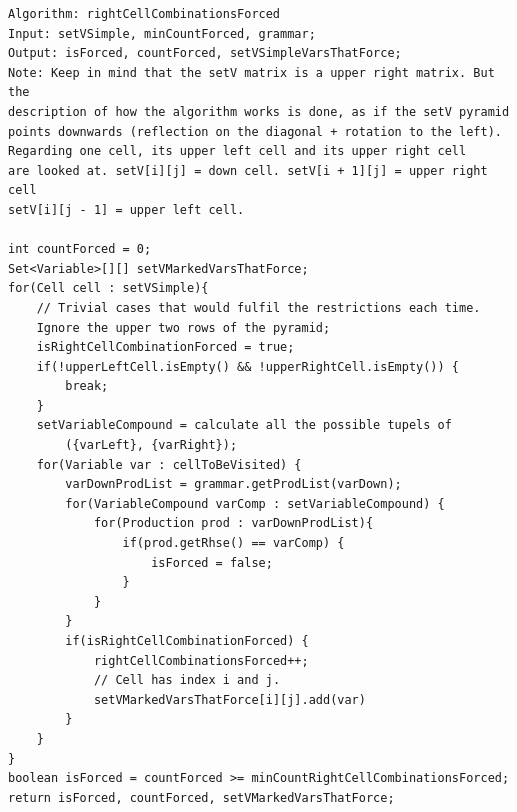 \pagebreak

\lstset{language=java}
\begin{lstlisting}[frame=htrbl, caption={rightCellCombinationsForced}, 
label={lst:rightCellCombinationsForced}]
Algorithm: rightCellCombinationsForced
Input: setVSimple, minCountForced, grammar;
Output: isForced, countForced, setVSimpleVarsThatForce;
Note: Keep in mind that the setV matrix is a upper right matrix. But the
description of how the algorithm works is done, as if the setV pyramid 
points downwards (reflection on the diagonal + rotation to the left).
Regarding one cell, its upper left cell and its upper right cell 
are looked at. setV[i][j] = down cell. setV[i + 1][j] = upper right cell
setV[i][j - 1] = upper left cell.

int countForced = 0;
Set<Variable>[][] setVMarkedVarsThatForce;
for(Cell cell : setVSimple){
	// Trivial cases that would fulfil the restrictions each time. 
	Ignore the upper two rows of the pyramid; 
	isRightCellCombinationForced = true;
	if(!upperLeftCell.isEmpty() && !upperRightCell.isEmpty()) {
		break;
	}
	setVariableCompound = calculate all the possible tupels of 
		({varLeft}, {varRight});
	for(Variable var : cellToBeVisited) {
		varDownProdList = grammar.getProdList(varDown);
		for(VariableCompound varComp : setVariableCompound) {
			for(Production prod : varDownProdList){
				if(prod.getRhse() == varComp) {
					isForced = false;
				}
			}
		}
		if(isRightCellCombinationForced) {
			rightCellCombinationsForced++;
			// Cell has index i and j.
			setVMarkedVarsThatForce[i][j].add(var)
		}
	}
}
boolean isForced = countForced >= minCountRightCellCombinationsForced;
return isForced, countForced, setVMarkedVarsThatForce;
\end{lstlisting}

\pagebreak

